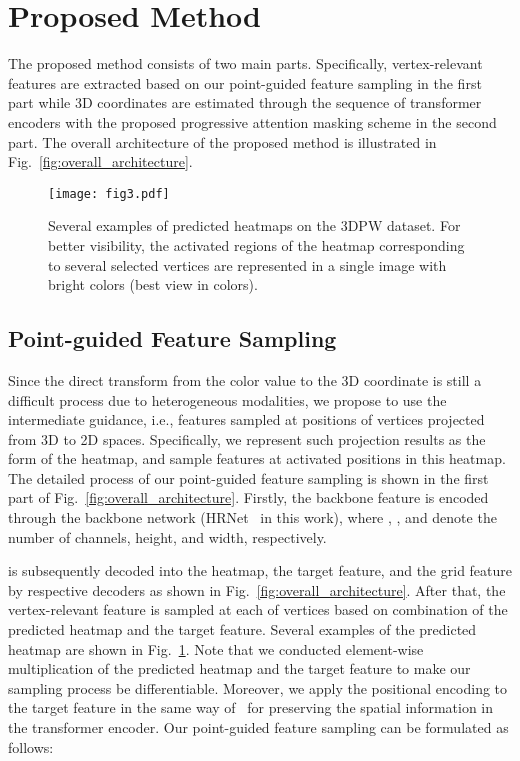 \documentclass[10pt,twocolumn,letterpaper]{article}
\begin{document}
\section{Proposed Method} 

The proposed method consists of two main parts. Specifically, vertex-relevant features are extracted based on our point-guided feature sampling in the first part while 3D coordinates are estimated through the sequence of transformer encoders with the proposed progressive attention masking scheme in the second part. The overall architecture of the proposed method is illustrated in Fig.~\ref{fig:overall_architecture}.

\begin{figure}
\centering
\centerline{\texttt{[image: fig3.pdf]}}
\vspace{-1mm}
\caption{\label{fig:heatmap} Several examples of predicted heatmaps on the 3DPW dataset. For better visibility, the activated regions of the heatmap corresponding to several selected vertices are represented in a single image with bright colors (best view in colors).}
\vspace{-3mm}
\end{figure}
\subsection{Point-guided Feature Sampling}

Since the direct transform from the color value to the 3D coordinate is still a difficult process due to heterogeneous modalities, we propose to use the intermediate guidance, i.e., features sampled at positions of vertices projected from 3D to 2D spaces. Specifically, we represent such projection results as the form of the heatmap, and sample features at activated positions in this heatmap.
The detailed process of our point-guided feature sampling is shown in the first part of Fig.~\ref{fig:overall_architecture}. Firstly, the backbone feature  is encoded through the backbone network (HRNet~\cite{Wang21} in this work), where , , and  denote the number of channels, height, and width, respectively.


 is subsequently decoded into the heatmap, the target feature, and the grid feature by respective decoders as shown in Fig.~\ref{fig:overall_architecture}. After that, the vertex-relevant feature is sampled at each of  vertices based on combination of the predicted heatmap and the target feature. 
Several examples of the predicted heatmap are shown in Fig.~\ref{fig:heatmap}. Note that we conducted element-wise multiplication of the predicted heatmap and the target feature to make our sampling process be differentiable. Moreover, we apply the positional encoding to the target feature in the same way of~\cite{Carion20,Cho22} for preserving the spatial information in the transformer encoder. Our point-guided feature sampling can be formulated as follows:
\end{document}
